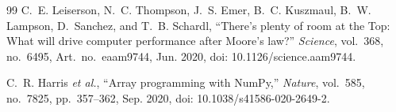 \documentclass[11pt,a4paper]{article}
\begin{document}
\begin{thebibliography}{99}
C.~E. Leiserson, N.~C. Thompson, J.~S. Emer, B.~C. Kuszmaul, B.~W. Lampson,
D.~Sanchez, and T.~B. Schardl, ``There's plenty of room at the Top: What will
drive computer performance after Moore's law?'' \emph{Science}, vol.~368,
no.~6495, Art.~no.~eaam9744, Jun. 2020, doi: 10.1126/science.aam9744.

C.~R. Harris \emph{et al.}, ``Array programming with NumPy,'' \emph{Nature},
vol.~585, no.~7825, pp.~357--362, Sep. 2020, doi: 10.1038/s41586-020-2649-2.

\end{thebibliography}
\end{document}
